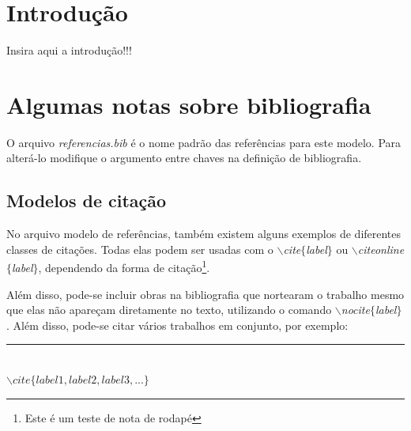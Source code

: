\documentclass[oneside,openright,12pt]{ufsm_2021} %
\author{Fulano de Tal}   %
\begin{document}
\pretextual  %


\chapter{Introdução}
\par Insira aqui a introdução!!!

\lipsum[1-5]



\chapter{Algumas notas sobre bibliografia}


\par O arquivo \textit{referencias.bib} é o nome padrão das referências para este modelo. Para alterá-lo modifique o argumento entre chaves na definição de bibliografia.


   \section{Modelos de citação}
      \par No arquivo modelo de referências, também existem alguns exemplos de diferentes classes de citações. Todas elas podem ser usadas com o \textit{$\backslash$cite$\{$label$\}$} ou \textit{$\backslash$citeonline$\{$label$\}$}, dependendo da forma de citação\footnote{Este é um teste de nota de rodapé}.

	\par Além disso, pode-se incluir obras na bibliografia que nortearam o trabalho mesmo que elas não apareçam diretamente no texto, utilizando o comando \textit{$\backslash$nocite$\{$label$\}$}. Além disso, pode-se citar vários trabalhos em conjunto, por exemplo:
	
	\begin{center}\rule{0.5\textwidth}{1pt}\\$\backslash cite\{label1,label2,label3,...\}$\end{center}
\end{document}
